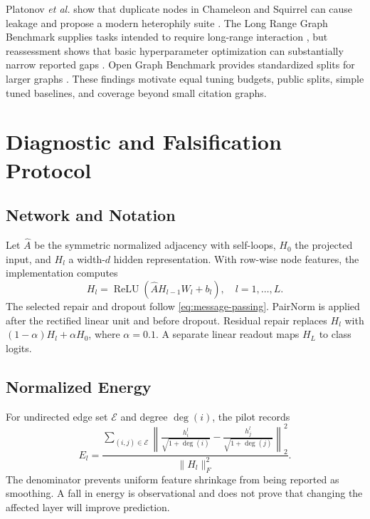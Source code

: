 \documentclass[journal]{IEEEtran}
\begin{document}
Platonov \emph{et al.} show that duplicate nodes in Chameleon and Squirrel can cause leakage and propose a modern heterophily suite \cite{platonov2023heterophily}. The Long Range Graph Benchmark supplies tasks intended to require long-range interaction \cite{dwivedi2022lrgb}, but reassessment shows that basic hyperparameter optimization can substantially narrow reported gaps \cite{tonshoff2023gap}. Open Graph Benchmark provides standardized splits for larger graphs \cite{hu2020ogb}. These findings motivate equal tuning budgets, public splits, simple tuned baselines, and coverage beyond small citation graphs.

\section{Diagnostic and Falsification Protocol}

\subsection{Network and Notation}

Let $\widehat{A}$ be the symmetric normalized adjacency with self-loops, $H_0$ the projected input, and $H_l$ a width-$d$ hidden representation. With row-wise node features, the implementation computes
\begin{equation}
H_l=\operatorname{ReLU}(\widehat{A}H_{l-1}W_l+b_l),\quad l=1,\ldots,L.
\label{eq:message-passing}
\end{equation}
The selected repair and dropout follow \eqref{eq:message-passing}. PairNorm is applied after the rectified linear unit and before dropout. Residual repair replaces $H_l$ with $(1-\alpha)H_l+\alpha H_0$, where $\alpha=0.1$. A separate linear readout maps $H_L$ to class logits.

\subsection{Normalized Energy}

For undirected edge set $\mathcal{E}$ and degree $\deg(i)$, the pilot records
\begin{equation}
E_l=\frac{\sum_{(i,j)\in\mathcal{E}}\left\|\frac{h_i^l}{\sqrt{1+\deg(i)}}-\frac{h_j^l}{\sqrt{1+\deg(j)}}\right\|_2^2}{\|H_l\|_F^2}.
\label{eq:energy}
\end{equation}
The denominator prevents uniform feature shrinkage from being reported as smoothing. A fall in energy is observational and does not prove that changing the affected layer will improve prediction.
\end{document}
